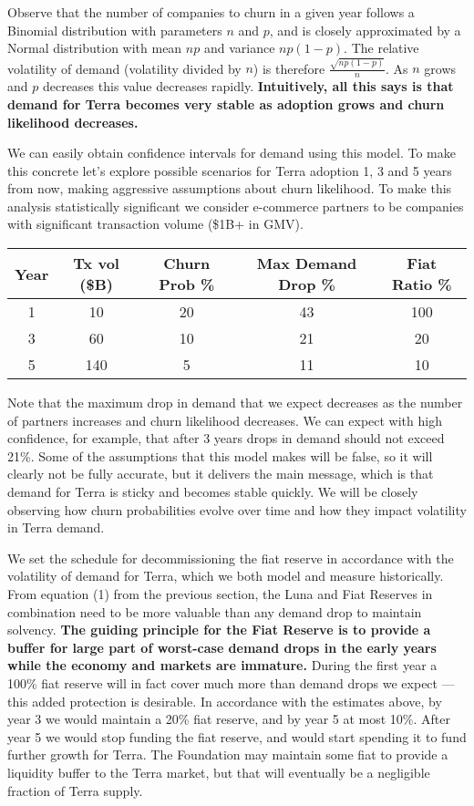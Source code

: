 \documentclass{article}
\begin{document}
Observe that the number of companies to churn in a given year follows a Binomial distribution with parameters $n$ and $p$, and is closely approximated by a Normal distribution with mean $np$ and variance $np(1-p)$. The relative volatility of demand (volatility divided by $n$) is therefore $\frac{\sqrt{np(1-p)}}{n}$. As $n$ grows and $p$ decreases this value decreases rapidly. \textbf{Intuitively, all this says is that demand for Terra becomes very stable as adoption grows and churn likelihood decreases.}

We can easily obtain confidence intervals for demand using this model. To make this concrete let's explore possible scenarios for Terra adoption 1, 3 and 5 years from now, making aggressive assumptions about churn likelihood. To make this analysis statistically significant we consider e-commerce partners to be companies with significant transaction volume (\$1B+ in GMV).

\begin{center}
\begin{tabular}{ |c|c|c|c|c| } 
 \hline
Year & Tx vol (\$B) & Churn Prob \% & Max Demand Drop \% & Fiat Ratio \% \\
 \hline \hline
1 & 10 & 20 & 43 & 100 \\
\hline
3 & 60 & 10 & 21 & 20 \\
\hline
5 & 140 & 5 & 11 & 10 \\
 \hline
\end{tabular}
\end{center}


Note that the maximum drop in demand that we expect decreases as the number of partners increases and churn likelihood decreases. We can expect with high confidence, for example, that after 3 years drops in demand should not exceed 21\%. Some of the assumptions that this model makes will be false, so it will clearly not be fully accurate, but it delivers the main message, which is that demand for Terra is sticky and becomes stable quickly. We will be closely observing how churn probabilities evolve over time and how they impact volatility in Terra demand.

We set the schedule for decommissioning the fiat reserve in accordance with the volatility of demand for Terra, which we both model and measure historically. From equation (1) from the previous section, the Luna and Fiat Reserves in combination need to be more valuable than any demand drop to maintain solvency. \textbf{The guiding principle for the Fiat Reserve is to provide a buffer for large part of worst-case demand drops in the early years while the economy and markets are immature.} During the first year a 100\% fiat reserve will in fact cover much more than demand drops we expect — this added protection is desirable. In accordance with the estimates above, by year 3 we would maintain a 20\% fiat reserve, and by year 5 at most 10\%. After year 5 we would stop funding the fiat reserve, and would start spending it to fund further growth for Terra. The Foundation may maintain some fiat to provide a liquidity buffer to the Terra market, but that will eventually be a negligible fraction of Terra supply.
\end{document}
